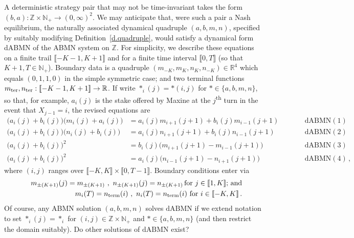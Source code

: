 \documentclass[letterpaper,11pt,oneside,reqno]{amsbook}
\newcommand{\N}{\ensuremath{\mathbb{N}}}
\newcommand{\R}{\ensuremath{\mathbb{R}}}
\newcommand{\Z}{\ensuremath{\mathbb{Z}}}
\numberwithin{figure}{chapter}
\theoremstyle{definition}
\theoremstyle{definition}
\theoremstyle{definition}
\theoremstyle{definition}
\theoremstyle{definition}
\newcommand{\intint}[1]{\llbracket 1,#1 \rrbracket}
\newcommand{\nwithoutzero}{\N_+}
\newcommand{\dabmnmac}{\textrm{dABMN}}
\newcommand{\abmnmacspace}{\textrm{ABMN} }
\newcommand{\dabmnmacspace}{\textrm{dABMN} }
\begin{document}
A deterministic strategy pair that may not be time-invariant takes the form $(b,a):\Z \times \nwithoutzero \to (0,\infty)^2$. We may anticipate that, were such a pair a Nash equilibrium, the naturally associated dynamical quadruple $(a,b,m,n)$, specified by suitably modifying Definition~\ref{d.quadruple}, would satisfy a dynamical form \dabmnmacspace of 
the ABMN system on $\Z$. For simplicity, we describe these equations on a finite trail $\llbracket -K-1,K+1\rrbracket$
and for a finite time interval $\llbracket 0, T \rrbracket$ (so that $K+1,T \in \nwithoutzero$). Boundary data is a quadruple $(m_{-K},m_K,n_K,n_{-K}) \in \R^4$ which equals $(0,1,1,0)$
in the simple symmetric case; and two terminal functions $m_{\rm ter},n_{\rm ter}: \llbracket -K-1,K+1 \rrbracket \to \R$.  
If write $*_i(j) = *(i,j)$ for $* \in \{a,b,m,n\}$, so that, for example, $a_i(j)$ is the stake offered by Maxine at the $j$\textsuperscript{th}
turn in the event that $X_{j-1} =i$, the revised equations are  
\begin{align*}
  \big( a_i(j) + b_i(j) \big)\big(m_i(j) + a_i(j) \big)  & =  a_i(j) m_{i+1}(j+1) + b_i(j) m_{i-1}(j+1) && \qquad \textrm{dABMN}(1) \\
   \big(a_i(j) + b_i(j) \big) \big(n_i(j)+b_i(j) \big)  & =  a_i(j) n_{i+1}(j+1) + b_i(j) n_{i-1}(j+1)  &&\qquad \textrm{dABMN}(2)   \\
   \big(a_i(j) + b_i(j) \big)^2  & =  b_i(j) \big( m_{i+1}(j+1) - m_{i-1}(j+1) \big) &&\qquad \textrm{dABMN}(3)   \\
       \big(a_i(j) + b_i(j) \big)^2  & =   a_i(j) \big( n_{i-1}(j+1) - n_{i+1}(j+1) \big) &&\qquad \textrm{dABMN}(4)   \, ,
  \end{align*}
   where $(i,j)$ ranges over $\llbracket -K,K \rrbracket \times \llbracket 0, T-1 \rrbracket$. Boundary conditions enter via
 \begin{eqnarray*}
   & &  m_{\pm (K+1)}(j) = m_{\pm  (K+1)} \, \, , \, \,   n_{\pm  (K+1)}(j) = n_{\pm  (K+1)} \,  \textrm{for $j \in \intint{K}$; and} \\
   & &  m_i(T) = n_{\rm term}(i) \, \, , \, \, n_i(T) = n_{\rm term}(i)  \, \,  \textrm{for $i \in \llbracket{-K,K \rrbracket}$} \, .
  \end{eqnarray*}
   Of course, any \abmnmacspace solution $(a,b,m,n)$ solves $\dabmnmac$ if we extend notation to set $*_i(j) = *_i$ for $(i,j) \in \Z \times \nwithoutzero$ and $* \in \{a,b,m,n\}$ (and then restrict the domain suitably). Do other solutions of $\dabmnmac$ exist?
\end{document}
